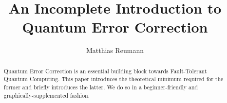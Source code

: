 \documentclass[a4paper,twocolumn,11pt]{quantumarticle}
\begin{document}
\title{{An Incomplete Introduction to Quantum Error Correction}}
\author{Matthias Reumann}
\maketitle

\begin{abstract}
    Quantum Error Correction is an essential building block towards {Fault-Tolerant} Quantum Computing. This paper introduces the theoretical minimum required for the former and briefly introduces the latter. We do so in a beginner-friendly and graphically-supplemented fashion.
\end{abstract}













\end{document}
